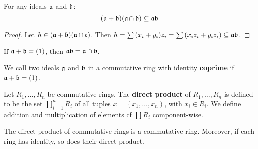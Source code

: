 \begin{theorem}\label{theorem_5.5.8}
  For any ideals $\af$ and $\bf$:
  \begin{equation}
    (\af+\bf)(\af \cap \bf) \subseteq \af\bf
  \end{equation}
\end{theorem}
\begin{proof}
  Let $h \in (\af+\bf)(\af \cap \cf)$. Then $h=\sum{(x_i+y_i)z_i}=
  \sum{(x_iz_i+y_iz_i)} \subseteq \af\bf$.
\end{proof}
\begin{corollary}
  If $\af+\bf=(1)$, then $\af\bf=\af \cap \bf$.
\end{corollary}

\begin{definition}
  We call two ideals $\af$ and $\bf$ in a commutative ring with
  identity \textbf{coprime} if $\af+\bf=(1)$.
\end{definition}

\begin{definition}
  Let $R_1, \dots, R_n$ be commutative rings. The \textbf{direct product} of
  $R_1, \dots, R_n$ is defined to be the set $\prod_{i=1}^n{R_i}$ of all tuples
  $x=(x_1, \dots, x_n)$, with $x_i \in R_i$. We define addition and
  multiplication of elements of $\prod{R_i}$ component-wise.
\end{definition}

\begin{proposition}\label{proposition_5.5.9}
  The direct product of commutative rings is a commutative ring. Moreover, if
  each ring has identity, so does their direct product.
\end{proposition}


